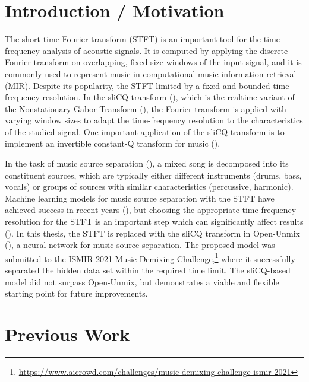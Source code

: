 \documentclass[letter,12pt]{article}
\title{\ThesisTitle}
\author{Sevag Hanssian, sevag.hanssian@mail.mcgill.ca}
\begin{document}
\maketitle

\section{Introduction / Motivation}

The short-time Fourier transform (STFT) is an important tool for the time-frequency analysis of acoustic signals. It is computed by applying the discrete Fourier transform on overlapping, fixed-size windows of the input signal, and it is commonly used to represent music in computational music information retrieval (MIR). Despite its popularity, the STFT limited by a fixed and bounded time-frequency resolution. In the sliCQ transform (\cite{invertiblecqt}), which is the realtime variant of the Nonstationary Gabor Transform (\cite{balazs}), the Fourier transform is applied with varying window sizes to adapt the time-frequency resolution to the characteristics of the studied signal. One important application of the sliCQ transform is to implement an invertible constant-Q transform for music (\cite{jbrown, klapuricqt}).

In the task of music source separation (\cite{musicsepgood}), a mixed song is decomposed into its constituent sources, which are typically either different instruments (drums, bass, vocals) or groups of sources with similar characteristics (percussive, harmonic). Machine learning models for music source separation with the STFT have achieved success in recent years (\cite{sisec2018}), but choosing the appropriate time-frequency resolution for the STFT is an important step which can significantly affect results (\cite{tftradeoff1, tftradeoff2}). In this thesis, the STFT is replaced with the sliCQ transform in Open-Unmix (\cite{umx}), a neural network for music source separation. The proposed model was submitted to the ISMIR 2021 Music Demixing Challenge,\footnote{\url{https://www.aicrowd.com/challenges/music-demixing-challenge-ismir-2021}} where it successfully separated the hidden data set within the required time limit. The sliCQ-based model did not surpass Open-Unmix, but demonstrates a viable and flexible starting point for future improvements.

\section{Previous Work}
\end{document}
